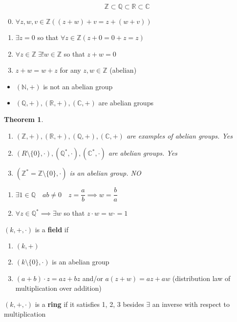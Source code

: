 \documentclass[letterpaper, 12pt]{article}
\newtheorem{theorem}{Theorem}[section]
\newenvironment{proof}[1][Proof]{\begin{trivlist}
\item[\hskip \labelsep {\bfseries #1}]}{\end{trivlist}}
\newenvironment{definition}[1][Definition]{\begin{trivlist}
\item[\hskip \labelsep {\bfseries #1}]}{\end{trivlist}}
\newcommand{\keyword}[1]{\textbf{#1}}
\newcommand{\N}{\mathbb{N}}
\newcommand{\Z}{\mathbb{Z}}
\newcommand{\Q}{\mathbb{Q}}
\newcommand{\R}{\mathbb{R}}
\newcommand{\C}{\mathbb{C}}
\newcommand{\0}{\emptyset}
\begin{document}
    \[\Z \subset \Q \subset \R \subset \C\]
    \begin{enumerate}
        \setcounter{enumi}{-1}
        \item $\forall z, w, v \in \Z ((z + w) + v = z + (w + v))$
        \item $\exists z = 0$ so that $\forall z \in \Z (z + 0 = 0 + z = z)$
        \item $\forall z \in \Z \; \exists! w \in \Z$ so that $z + w = 0$
        \item $z + w = w + z$ for any $z, w \in \Z$ (abelian)
    \end{enumerate}
    \begin{itemize}
        \item $(\N, +)$ is not an abelian group
        \item $(\Q, +), (\R, +), (\C, +)$ are abelian groups
    \end{itemize}
    \begin{theorem}
        \hfill
        \begin{enumerate}
            \item $(\Z, +), (\R, +), (\Q, +), (\C, +)$ are examples of abelian groups.
            Yes
            \item $(R \setminus \{0\}, \cdot), (\Q^*, \cdot), (\C^*, \cdot)$ are abelian groups.
            Yes
            \item $(\Z^* = \Z \setminus \{0\}, \cdot)$ is an abelian group.
            NO
        \end{enumerate}
    \end{theorem}
    \begin{proof}
        \hfill
        \begin{enumerate}
            \item $\exists 1 \in \Q \quad ab \ne 0 \quad z = \dfrac{a}{b} \implies w = \dfrac{b}{a}$
            \item $\forall z \in \Q^* \implies \exists w$ so that $z \cdot w = w \cdot = 1$
        \end{enumerate}
    \end{proof}
    \begin{definition}
        $(k, +, \cdot)$ is a \keyword{field} if
        \begin{enumerate}
            \item $(k, +)$
            \item $(k \setminus \{0\}, \cdot)$ is an abelian group
            \item $(a + b) \cdot z = az + bz$ and/or $a(z + w) = az + aw$ 
            (distribution law of multiplication over addition)
        \end{enumerate}
        $(k, +, \cdot)$ is a \keyword{ring} if it satisfies 1, 2, 3 
        besides $\exists$ an inverse with respect to multiplication
    \end{definition}
\end{document}
